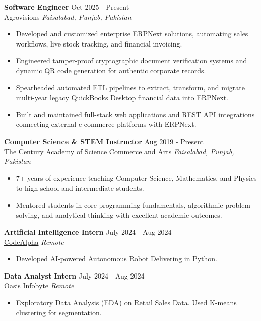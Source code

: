 \documentclass[11pt]{article}
\begin{document}
\textbf{Software Engineer} \hfill {Oct 2025 - Present}\\
Agrovisions \hfill \textit{Faisalabad, Punjab, Pakistan}
 \begin{itemize}
    \item Developed and customized enterprise ERPNext solutions, automating sales workflows, live stock tracking, and financial invoicing.
    \item Engineered tamper-proof cryptographic document verification systems and dynamic QR code generation for authentic corporate records.
    \item Spearheaded automated ETL pipelines to extract, transform, and migrate multi-year legacy QuickBooks Desktop financial data into ERPNext.
    \item Built and maintained full-stack web applications and REST API integrations connecting external e-commerce platforms with ERPNext.
 \end{itemize}

\textbf{Computer Science \& STEM Instructor} \hfill {Aug 2019 - Present}\\
The Century Academy of Science Commerce and Arts \hfill \textit{Faisalabad, Punjab, Pakistan}
 \begin{itemize}
    \item 7+ years of experience teaching Computer Science, Mathematics, and Physics to high school and intermediate students.
    \item Mentored students in core programming fundamentals, algorithmic problem solving, and analytical thinking with excellent academic outcomes.
 \end{itemize}

\textbf{Artificial Intelligence Intern} \hfill {July 2024 - Aug 2024}\\
\href{https://drive.google.com/file/d/1syawCrgE8id9mzc0ZiT1t117xPCDsfIO/view?usp=sharing}{CodeAlpha} \hfill \textit{Remote}
 \begin{itemize}
    \item Developed AI-powered Autonomous Robot Delivering in Python.
 \end{itemize}

\textbf{Data Analyst Intern} \hfill {July 2024 - Aug 2024}\\
\href{https://drive.google.com/file/d/1yu_jIlMerBSrHOmADeX0vAIW49il-OhV/view?usp=sharing}{Oasis Infobyte} \hfill \textit{Remote}
 \begin{itemize}
    \item Exploratory Data Analysis (EDA) on Retail Sales Data. Used K-means clustering for segmentation.
 \end{itemize}
\end{document}

